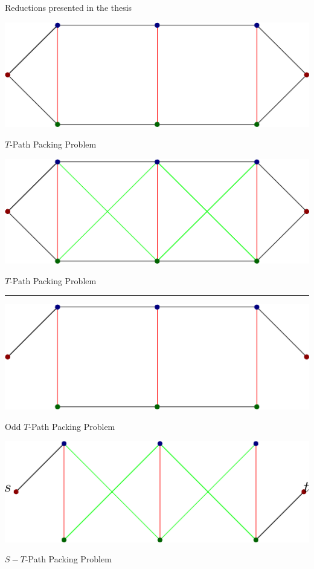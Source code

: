 \documentclass{beamer}
\begin{document}
\begin{frame}{Reductions presented in the thesis}
	\begin{minipage}[t][.3\textheight][t]{\linewidth}
		\begin{minipage}[t][\textheight][t]{.45\linewidth}
		\centering
		\vspace{1cm}
		\includegraphics[width=.5\textwidth]{figures/reductions/graph-first.eps}
		
		\centering $T$-Path Packing Problem
		\end{minipage}
		\hfill
		\vline
		\hfill
		\begin{minipage}[t][\textheight][t]{.45\linewidth}
		\centering
		\vspace{1cm}
		\includegraphics[width=.5\textwidth]{figures/reductions/graph-second.eps}

		\centering $T$-Path Packing Problem
		\end{minipage}
	\end{minipage}
		\vfill
		\hrule
		\vfill
	\begin{minipage}[t][.3\textheight][t]{\linewidth}
		\begin{minipage}[t][\textheight][t]{.45\linewidth}
		\centering
		\vspace{1cm}
		\includegraphics[width=.5\textwidth]{figures/reductions/graph-odd.eps}

		\centering Odd $T$-Path Packing Problem
		\end{minipage}
		\hfill
		\hfill
		\begin{minipage}[t][\textheight][t]{.45\linewidth}
		\centering
		\vspace{1cm}
		\includegraphics[width=.5\textwidth]{figures/reductions/graph-st.eps}

		\centering $S-T$-Path Packing Problem
		\end{minipage}
	\end{minipage}

\end{frame}
\end{document}
